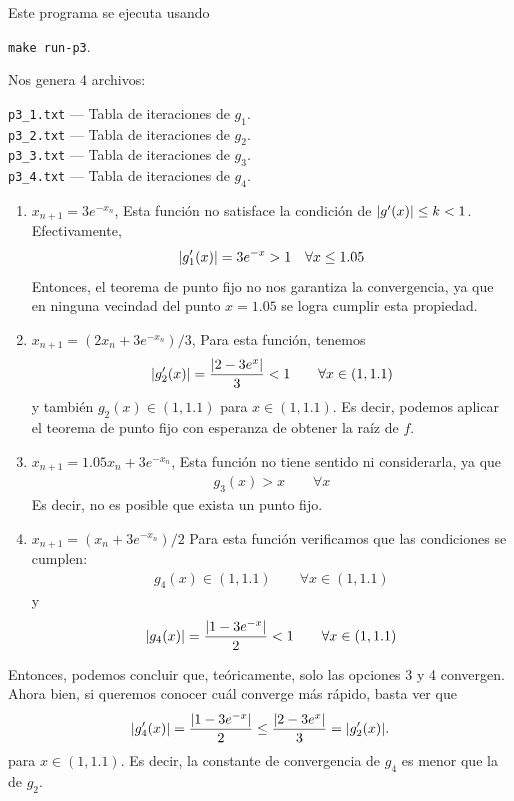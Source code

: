 \begin{solution}
Este programa se ejecuta usando
\begin{center}
  \texttt{make run-p3}.
\end{center}
Nos genera 4 archivos:
\begin{center}
		\texttt{p3\_1.txt} --- Tabla de iteraciones de $ g_1 $.\\
		\texttt{p3\_2.txt} --- Tabla de iteraciones de $ g_2 $.\\
    \texttt{p3\_3.txt} --- Tabla de iteraciones de $ g_3 $.\\
    \texttt{p3\_4.txt} --- Tabla de iteraciones de $ g_4 $.
\end{center}

\begin{enumerate}
	\item $\displaystyle x_{n+1} = 3e^{-x_n} $,
	      Esta funci\'on no satisface la condici\'on de $ \lvert g'(x) \rvert \leq k< 1 $. Efectivamente,
	      \begin{align*}
		      \lvert g_1'(x) \rvert = 3e^{-x} > 1 \quad \forall x \leq 1.05
	      \end{align*}
	      Entonces, el teorema de punto fijo no nos garantiza la convergencia, ya que en ninguna vecindad del punto $ x=1.05 $ se logra cumplir esta propiedad.
	\item $\displaystyle x_{n+1} = (2x_n + 3e^{-x_n})/3$,
	      Para esta funci\'on, tenemos
	      \begin{align*}
		      \lvert g_2'(x) \rvert =\frac{\lvert 2 - 3e^{x} \rvert}{3} < 1\qquad \forall x\in (1, 1.1)
	      \end{align*}
	      y tambi\'en $ g_2(x) \in (1,1.1) $ para $ x\in (1, 1.1) $. Es decir,
	      podemos aplicar el teorema de punto fijo con esperanza de obtener la
	      ra\'iz de $ f $.
	\item $\displaystyle x_{n+1} = 1.05x_n + 3e^{-x_n} $,
	      Esta funci\'on no tiene sentido ni considerarla, ya que
	      \begin{align*}
		      g_3(x) > x \qquad \forall x
	      \end{align*}
	      Es decir, no es posible que exista un punto fijo.
	\item $\displaystyle x_{n+1} = (x_n+3e^{-x_n})/2$
	      Para esta funci\'on verificamos que las condiciones se cumplen:
	      \begin{align*}
		      g_4(x) \in (1, 1.1) \qquad \forall x\in(1,1.1)
	      \end{align*}
	      y
	      \begin{align*}
		      \lvert g_4(x) \rvert =\frac{\lvert 1-3e^{-x} \rvert}{2} < 1\qquad \forall x\in(1, 1.1)
	      \end{align*}
\end{enumerate}
Entonces, podemos concluir que, te\'oricamente, solo las opciones 3 y 4 convergen. Ahora bien, si queremos conocer cu\'al converge m\'as r\'apido, basta ver que
\begin{align*}
	\lvert g'_4(x) \rvert = \frac{\lvert 1-3e^{-x} \rvert}{2} \leq \frac{\lvert 2 - 3e^{x} \rvert}{3}= \lvert g'_2(x) \rvert.
\end{align*}
para $ x\in (1,1.1) $. Es decir, la constante de convergencia de $ g_4 $ es menor que la de $ g_2 $.


\end{solution}
